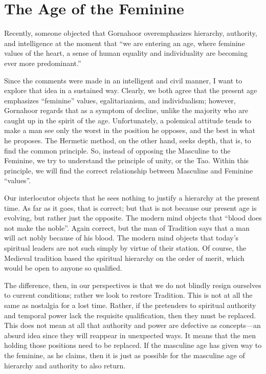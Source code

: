 \section{The Age of the Feminine}

Recently, someone objected that Gornahoor overemphasizes hierarchy, authority, and intelligence at the moment that ``we are entering an age, where feminine values of the heart, a sense of human equality and individuality are becoming ever more predominant.''

Since the comments were made in an intelligent and civil manner, I want to explore that idea in a sustained way. Clearly, we both agree that the present age emphasizes ``feminine'' values, egalitarianism, and individualism; however, Gornahoor regards that as a symptom of decline, unlike the majority who are caught up in the spirit of the age. Unfortunately, a polemical attitude tends to make a man see only the worst in the position he opposes, and the best in what he proposes. The Hermetic method, on the other hand, seeks depth, that is, to find the common principle. So, instead of opposing the Masculine to the Feminine, we try to understand the principle of unity, or the Tao. Within this principle, we will find the correct relationship between Masculine and Feminine ``values''.

Our interlocutor objects that he sees nothing to justify a hierarchy at the present time. As far as it goes, that is correct; but that is not because our present age is evolving, but rather just the opposite. The modern mind objects that ``blood does not make the noble''. Again correct, but the man of Tradition says that a man will act nobly because of his blood. The modern mind objects that today's spiritual leaders are not such simply by virtue of their station. Of course, the Medieval tradition based the spiritual hierarchy on the order of merit, which would be open to anyone so qualified.

The difference, then, in our perspectives is that we do not blindly resign ourselves to current conditions; rather we look to restore Tradition. This is not at all the same as nostalgia for a lost time. Rather, if the pretenders to spiritual authority and temporal power lack the requisite qualification, then they must be replaced. This does not mean at all that authority and power are defective as concepts---an absurd idea since they will reappear in unexpected ways. It means that the men holding those positions need to be replaced. If the masculine age has given way to the feminine, as he claims, then it is just as possible for the masculine age of hierarchy and authority to also return.

